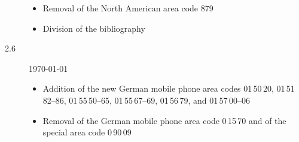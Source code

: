 \documentclass[numbers=noenddot]{scrreprt}
\begin{document}
\begin{description}
\begin{itemize}
\item Removal of the North American area code 879
\item Division of the bibliography
\end{itemize}
\item[2.6] \today
\begin{itemize}
\item Addition of the new German mobile phone area codes 01\,50\,20, 01\,51\,82--86, 01\,55\,50--65, 01\,55\,67--69, 01\,56\,79, and 01\,57\,00--06
\item Removal of the German mobile phone area code 0\,15\,70 and of the special area code 0\,90\,09
\end{itemize}
\end{description}
\end{document}
